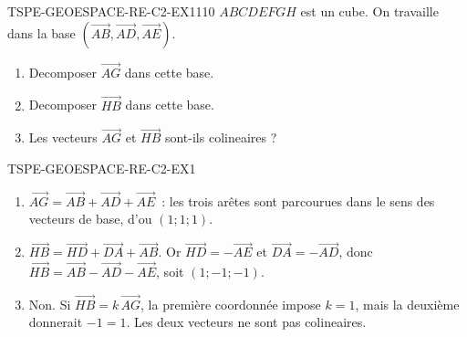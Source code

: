 
\begin{exercice}{TSPE-GEOESPACE-RE-C2-EX1}{1}{10}
$ABCDEFGH$ est un cube. On travaille dans la base
$(\vec{AB},\vec{AD},\vec{AE})$.
\begin{enumerate}
  \item Decomposer $\vec{AG}$ dans cette base.
  \item Decomposer $\vec{HB}$ dans cette base.
  \item Les vecteurs $\vec{AG}$ et $\vec{HB}$ sont-ils colineaires ?
\end{enumerate}
\end{exercice}


\begin{corrige}{TSPE-GEOESPACE-RE-C2-EX1}
\begin{enumerate}
  \item $\vec{AG}=\vec{AB}+\vec{AD}+\vec{AE}$~: les trois arêtes sont
        parcourues dans le sens des vecteurs de base, d'ou $(1;1;1)$.
  \item $\vec{HB}=\vec{HD}+\vec{DA}+\vec{AB}$. Or $\vec{HD}=-\vec{AE}$ et
        $\vec{DA}=-\vec{AD}$, donc
        $\vec{HB}=\vec{AB}-\vec{AD}-\vec{AE}$, soit $(1;-1;-1)$.
  \item Non. Si $\vec{HB}=k\,\vec{AG}$, la première coordonnée impose $k=1$,
        mais la deuxième donnerait $-1=1$. Les deux vecteurs ne sont pas
        colineaires.
\end{enumerate}
\end{corrige}
